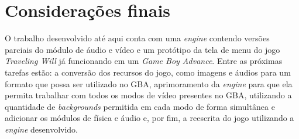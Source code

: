 \chapter[Considerações finais]{Considerações finais}

O trabalho desenvolvido até aqui conta com uma \textit{engine} contendo versões parciais do módulo de áudio e vídeo e um protótipo da tela de menu do jogo \textit{Traveling Will} já funcionando em um \textit{Game Boy Advance}. Entre as próximas tarefas estão: a conversão dos recursos do jogo, como imagens e áudios para um formato que possa ser utilizado no GBA, aprimoramento da \textit{engine} para que ela permita trabalhar com todos os modos de vídeo presentes no GBA, utilizando a quantidade de \textit{backgrounds} permitida em cada modo de forma simultânea e adicionar os módulos de física e áudio e, por fim, a reescrita do jogo utilizando a \textit{engine} desenvolvido.

